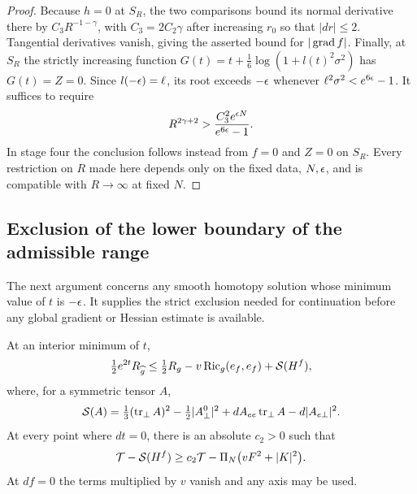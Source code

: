 \begin{proof}
Because $h=0$ at $S_R$, the two comparisons bound its normal derivative
there by $C_3R^{-1-\gamma}$, with $C_3=2C_2\gamma$ after increasing $r_0$
so that $|dr|\le2$.  Tangential derivatives vanish, giving the asserted
bound for $|\operatorname{grad} f|$.  Finally, at $S_R$ the strictly increasing function
$G(t)=t+\frac16\log(1+l(t)^2\sigma^2)$ has $G(t)=Z=0$.
Since $l(-\epsilon)=\ell$, its root exceeds $-\epsilon$ whenever
$\ell^2\sigma^2<e^{6\epsilon}-1$.  It suffices to require
\begin{equation}\label{four:maximal:def:outer-radius-floor}
 R^{2\gamma+2}>
 \frac{C_3^2e^{\epsilon N}}{e^{6\epsilon}-1}.
\end{equation}
In stage four the conclusion follows instead from $f=0$ and $Z=0$ on
$S_R$.  Every restriction on $R$ made here depends only on the fixed
data, $N,\epsilon$, and is compatible with $R\to\infty$ at fixed $N$.
\end{proof}

\subsection{Exclusion of the lower boundary of the admissible range}

The next argument concerns any smooth homotopy solution whose minimum
value of $t$ is $-\epsilon$.  It supplies the strict exclusion needed for
continuation before any global gradient or Hessian estimate is available.

\begin{lemma}\label{four:maximal:def:gauss-minimum}
At an interior minimum of $t$,
\begin{equation}\label{four:maximal:def:graph-gauss}
 \tfrac12e^{2t}R_{\widehat g}
 \le\tfrac12R_g-v\operatorname{Ric}_g(e_f,e_f)+\mathcal S(H^f),
\end{equation}
where, for a symmetric tensor $A$,
\begin{equation}\label{four:maximal:def:gauss-form}
 \mathcal S(A)=\tfrac13(\operatorname{tr}_\perp A)^2
 -\tfrac12|A_\perp^0|^2
 +dA_{ee}\operatorname{tr}_\perp A-d|A_{e\perp}|^2.
\end{equation}
At every point where $dt=0$, there is an absolute $c_2>0$ such that
\begin{equation}\label{four:maximal:def:floor-comparison}
 \mathcal T-\mathcal S(H^f)
 \ge c_2\mathcal T-\Pi_N\bigl(vF^2+|K|^2\bigr).
\end{equation}
At $df=0$ the terms multiplied by $v$ vanish and any axis may be used.
\end{lemma}

